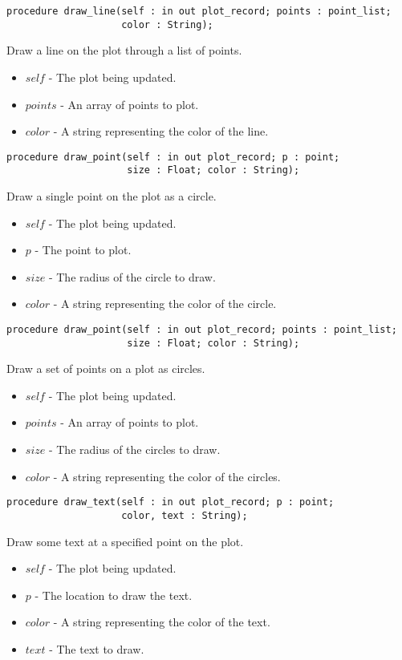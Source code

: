 \documentclass[10pt, openany]{book}
\begin{document}
\begin{lstlisting}
procedure draw_line(self : in out plot_record; points : point_list;
                    color : String);
\end{lstlisting}
Draw a line on the plot through a list of points.
\begin{itemize}
  \item $self$ - The plot being updated.
  \item $points$ - An array of points to plot.
  \item $color$ - A string representing the color of the line.
\end{itemize}
\begin{lstlisting}
procedure draw_point(self : in out plot_record; p : point;
                     size : Float; color : String);
\end{lstlisting}
Draw a single point on the plot as a circle.
\begin{itemize}
  \item $self$ - The plot being updated.
  \item $p$ - The point to plot.
  \item $size$ - The radius of the circle to draw.
  \item $color$ - A string representing the color of the circle.
\end{itemize}
\begin{lstlisting}
procedure draw_point(self : in out plot_record; points : point_list;
                     size : Float; color : String);
\end{lstlisting}
Draw a set of points on a plot as circles.
\begin{itemize}
  \item $self$ - The plot being updated.
  \item $points$ - An array of points to plot.
  \item $size$ - The radius of the circles to draw.
  \item $color$ - A string representing the color of the circles.
\end{itemize}
\begin{lstlisting}
procedure draw_text(self : in out plot_record; p : point;
                    color, text : String);
\end{lstlisting}
Draw some text at a specified point on the plot.
\begin{itemize}
  \item $self$ - The plot being updated.
  \item $p$ - The location to draw the text.
  \item $color$ - A string representing the color of the text.
  \item $text$ - The text to draw.
\end{itemize}
\end{document}
